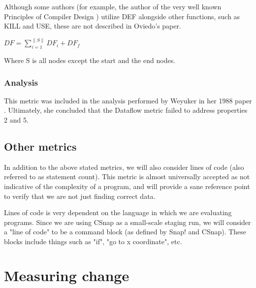 \documentclass[]{article}
\begin{document}
Although some authors (for example, the author of the very well known Principles of Compiler Design \cite{aho1977principles}) utilize DEF alongside other functions, such as KILL and USE, these are not described in Oviedo's paper.

$DF = \sum\limits_{i=1}^{\parallel S \parallel} DF_i+DF_f$

Where S is all nodes except the start and the end nodes.


\subsubsection{Analysis}

This metric was included in the analysis performed by Weyuker in her 1988 paper \cite{ref:evaluating_software_complexity_measures}.
Ultimately, she concluded that the Dataflow metric failed to address properties 2 and 5.

\subsection{Other metrics}

In addition to the above stated metrics, we will also consider lines of code (also referred to as statement count).
This metric is almost universally accepted as not indicative of the complexity of a program, and will provide a sane reference point to verify that we are not just finding correct data.

Lines of code is very dependent on the language in which we are evaluating programs.
Since we are using CSnap as a small-scale staging run, we will consider a "line of code" to be a command block (as defined by Snap! and CSnap).
These blocks include things such as "if", "go to {x coordinate}", etc.

\section{Measuring change}



\end{document}
